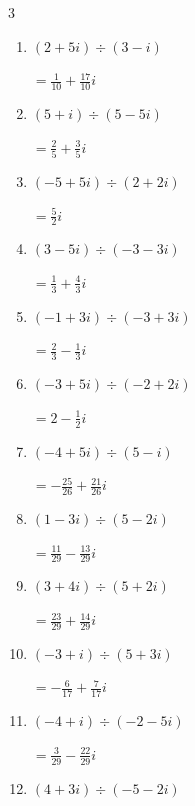 \begin{multicols}{3}
\begin{enumerate}
        $\displaystyle =-\frac{14}{17}+\frac{5}{17}i$

  \item $\displaystyle (2+5i)\div(3-i)$

        $\displaystyle =\frac{1}{10}+\frac{17}{10}i$

  \item $\displaystyle (5+i)\div(5-5i)$

        $\displaystyle =\frac{2}{5}+\frac{3}{5}i$

  \item $\displaystyle (-5+5i)\div(2+2i)$

        $\displaystyle =\frac{5}{2}i$

  \item $\displaystyle (3-5i)\div(-3-3i)$

        $\displaystyle =\frac{1}{3}+\frac{4}{3}i$

  \item $\displaystyle (-1+3i)\div(-3+3i)$

        $\displaystyle =\frac{2}{3}-\frac{1}{3}i$

  \item $\displaystyle (-3+5i)\div(-2+2i)$

        $\displaystyle =2-\frac{1}{2}i$

  \item $\displaystyle (-4+5i)\div(5-i)$

        $\displaystyle =-\frac{25}{26}+\frac{21}{26}i$

  \item $\displaystyle (1-3i)\div(5-2i)$

        $\displaystyle =\frac{11}{29}-\frac{13}{29}i$

\columnbreak %

  \item $\displaystyle (3+4i)\div(5+2i)$

        $\displaystyle =\frac{23}{29}+\frac{14}{29}i$

  \item $\displaystyle (-3+i)\div(5+3i)$

        $\displaystyle =-\frac{6}{17}+\frac{7}{17}i$

  \item $\displaystyle (-4+i)\div(-2-5i)$

        $\displaystyle =\frac{3}{29}-\frac{22}{29}i$

  \item $\displaystyle (4+3i)\div(-5-2i)$


\end{enumerate}
\end{multicols}
